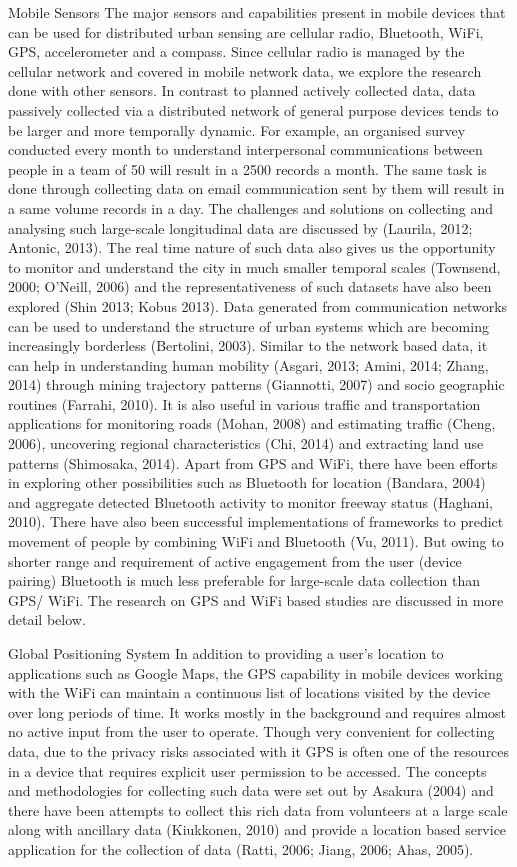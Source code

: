  Mobile Sensors
 The major sensors and capabilities present in mobile devices that can be used for distributed urban sensing are cellular radio, Bluetooth, WiFi, GPS, accelerometer and a compass. Since cellular radio is managed by the cellular network and covered in mobile network data, we explore the research done with other sensors. In contrast to planned actively collected data, data passively collected via a distributed network of general purpose devices tends to be larger and more temporally dynamic. For example, an organised survey conducted every month to understand interpersonal communications between people in a team of 50 will result in a 2500 records a month. The same task is done through collecting data on email communication sent by them will result in a same volume records in a day. The challenges and solutions on collecting and analysing such large-scale longitudinal data are discussed by (Laurila, 2012; Antonic, 2013). The real time nature of such data also gives us the opportunity to monitor and understand the city in much smaller temporal scales (Townsend, 2000; O'Neill, 2006) and the representativeness of such datasets have also been explored (Shin 2013; Kobus 2013). Data generated from communication networks can be used to understand the structure of urban systems which are becoming increasingly borderless (Bertolini, 2003). Similar to the network based data, it can help in understanding human mobility (Asgari, 2013; Amini, 2014; Zhang, 2014) through mining trajectory patterns (Giannotti, 2007) and socio geographic routines (Farrahi, 2010). It is also useful in various traffic and transportation applications for monitoring roads (Mohan, 2008) and estimating traffic (Cheng, 2006), uncovering regional characteristics (Chi, 2014) and extracting land use patterns (Shimosaka, 2014). Apart from GPS and WiFi, there have been efforts in exploring other possibilities such as Bluetooth for location (Bandara, 2004) and aggregate detected Bluetooth activity to monitor freeway status (Haghani, 2010). There have also been successful implementations of frameworks to predict movement of people by combining WiFi and Bluetooth (Vu, 2011). But owing to shorter range and requirement of active engagement from the user (device pairing) Bluetooth is much less preferable for large-scale data collection than GPS/ WiFi. The research on GPS and WiFi based studies are discussed in more detail below.

 Global Positioning System
 In addition to providing a user’s location to applications such as Google Maps, the GPS capability in mobile devices working with the WiFi can maintain a continuous list of locations visited by the device over long periods of time. It works mostly in the background and requires almost no active input from the user to operate. Though very convenient for collecting data, due to the privacy risks associated with it GPS is often one of the resources in a device that requires explicit user permission to be accessed. The concepts and methodologies for collecting such data were set out by Asakura (2004) and there have been attempts to collect this rich data from volunteers at a large scale along with ancillary data (Kiukkonen, 2010) and provide a location based service application for the collection of data (Ratti, 2006; Jiang, 2006; Ahas, 2005).  

